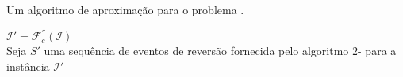 \begin{algorithm}[!tbh]
  \caption{Um algoritmo de aproximação para o problema \SbFIR{}.\label{algorithm:HSDBEFII}}
  $\mathcal{I}' = \mathcal{F}_{c}^{''}(\mathcal{I})$ \\
  Seja $S'$ uma sequência de eventos de reversão fornecida pelo algoritmo $2$-\SbIR{} para a instância $\mathcal{I}'$ \\
\end{algorithm}